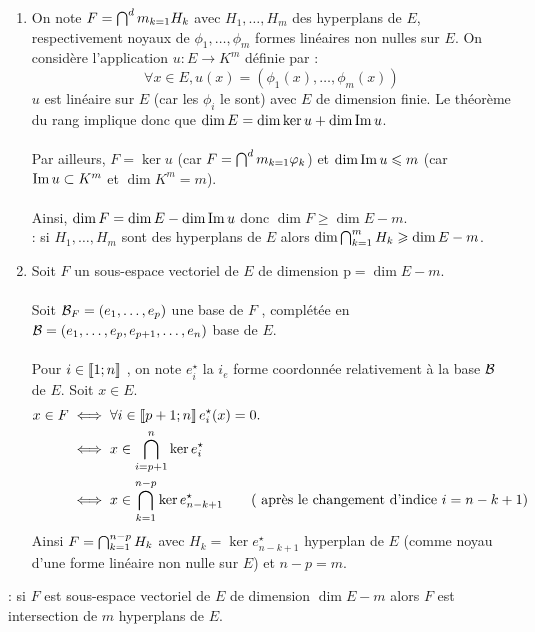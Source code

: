 \begin{dem}
    \begin{enumerate}
        \item On note \(F =\biginter^d{m}_{k=1}H_k\) avec \(H_1, \dots , H_m\) des hyperplans de \(E\), respectivement noyaux de \(\phi_1, \dots , \phi_m\) formes linéaires non nulles sur \(E\). On considère l’application \(u : E \to K^m\) définie par :
        \[\forall x \in  E, u(x) = (\phi_1(x), \dots , \phi_m(x)) \]
        \(u\) est linéaire sur \(E\) (car les \(\phi_i\) le sont) avec \(E\) de dimension finie. Le théorème du rang implique donc que \(\dim E = \dim \ker u + \dim \im u\).\\~\\
        Par ailleurs, \(F = \ker u\) (car \(F =\biginter^d{m}_{k=1}\phi_k\)) et \(\dim \im u \leq m\) (car \(\im u \subset K^m\) et \(\dim K^m = m\)).\\~\\
        Ainsi, \(\dim F = \dim E - \dim \im u\) donc \(\dim F \geq \dim E - m\).\\
        \conclusion : si \(H_1, \dots , H_m\) sont des hyperplans de \(E\) alors \(\dim\biginter^m_{k=1}H_k \geq \dim E - m\).
        \item Soit \(F\) un sous-espace vectoriel de \(E\) de dimension p\( = \dim E - m\).\\~\\
        Soit \(\cal{B}_F = (e_1, \dots , e_p)\) une base de \(F\) , complétée en \(\cal{B} = (e_1, \dots , e_p, e_{p+1}, \dots , e_n)\) base de \(E\).\\~\\
        Pour \(i \in \interventierii{1}{n}\) , on note \(e^{\star}_i\) la \(i_e\) forme coordonnée relativement à la base \(\cal{B}\) de \(E\).
        Soit \(x \in  E\).
        \begin{align*}
            x \in  F &\iff \forall i \in  \interventierii{p+1}{n}e^{\star}_i (x) = 0.\\
            &\iff x \in \biginter^{n}_{i=p+1} \ker e^{\star}_i \\
            &\iff x \in \biginter^{n-p}_{k=1}\ker e^{\star}_{n-k+1} \qquad (\text{ après le changement d’indice } i = n - k + 1)
        \end{align*}
        Ainsi \(F =\biginter^{n-p}_{k=1}H_k\) avec \(H_k = \ker e^{\star}_{n-k+1}\) hyperplan de \(E\) (comme noyau d’une forme linéaire non nulle sur \(E\)) et \(n - p = m\).
    \end{enumerate}
    \conclusion : si \(F\) est sous-espace vectoriel de \(E\) de dimension \(\dim E - m\) alors \(F\) est intersection de \(m\) hyperplans de \(E\).
\end{dem}

